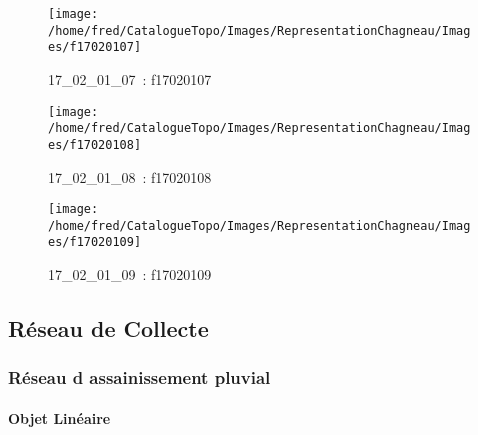 \documentclass[12pt,titlepage]{book}
\begin{document}
\begin{figure}[h!]
\begin{minipage}[t]{3cm}
    \begin{center}
      \texttt{[image: /home/fred/CatalogueTopo/Images/RepresentationChagneau/Images/f17020107]}
      \caption[~17\_02\_01\_07]{\small{17\_02\_01\_07~:} \tiny{f17020107}}\label{f17020107}
    \end{center}
  \end{minipage}
  \begin{minipage}[t]{3cm}
    \begin{center}
      \texttt{[image: /home/fred/CatalogueTopo/Images/RepresentationChagneau/Images/f17020108]}
      \caption[~17\_02\_01\_08]{\small{17\_02\_01\_08~:} \tiny{f17020108}}\label{f17020108}
    \end{center}
  \end{minipage}
  \begin{minipage}[t]{3cm}
    \begin{center}
      \texttt{[image: /home/fred/CatalogueTopo/Images/RepresentationChagneau/Images/f17020109]}
      \caption[~17\_02\_01\_09]{\small{17\_02\_01\_09~:} \tiny{f17020109}}\label{f17020109}
    \end{center}
  \end{minipage}
\end{figure}
\subsection{Réseau de Collecte}
\subsubsection{\large Réseau d assainissement pluvial}
\paragraph{Objet Linéaire}
\noindent
\vspace{\baselineskip}
\end{document}
